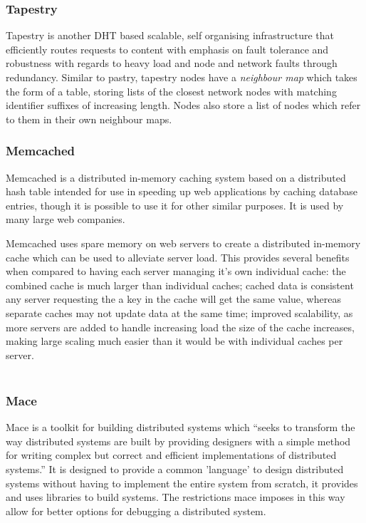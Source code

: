 \documentclass{article}
\begin{document}
\subsubsection{Tapestry}
Tapestry \cite{tapestry} is another DHT based scalable, self organising infrastructure that efficiently routes requests to content with emphasis on fault tolerance and robustness with regards to heavy load and node and network faults through redundancy.
Similar to pastry, tapestry nodes have a \textit{neighbour map} which takes the form of a table, storing lists of the closest network nodes with matching identifier suffixes of increasing length. Nodes also store a list of nodes which refer to them in their own neighbour maps.

\subsubsection{Memcached} 
Memcached\cite{memcached} is a distributed in-memory caching system based on a distributed hash table intended for use in speeding up web applications by caching database entries, though it is possible to use it for other similar purposes. It is used by many large web companies.

Memcached uses spare memory on web servers to create a distributed in-memory cache which can be used to alleviate server load. This provides several benefits when compared to having each server managing it's own individual cache: the combined cache is much larger than individual caches; cached data is consistent any server requesting the a key in the cache will get the same value, whereas separate caches may not update data at the same time; improved scalability, as more servers are added to handle increasing load the size of the cache increases, making large scaling much easier than it would be with individual caches per server.
\\
\\


\subsubsection{Mace} 
Mace\cite{mace} is a toolkit for building distributed systems which “seeks to transform the way distributed systems are built by providing designers with a simple method for writing complex but correct and efficient implementations of distributed systems.” \cite{mace_quote} It is designed to provide a common 'language' to design distributed systems without having to implement the entire system from scratch, it provides and uses libraries to build systems. The restrictions mace imposes in this way allow for better options for debugging a distributed system.
\end{document}
